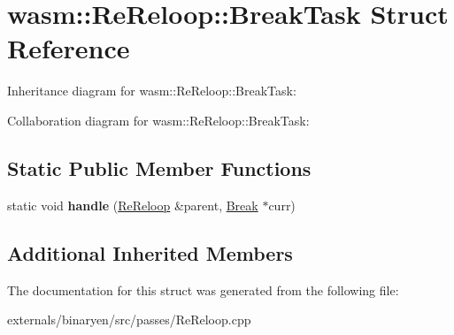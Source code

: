 \hypertarget{structwasm_1_1_re_reloop_1_1_break_task}{}\section{wasm\+:\+:Re\+Reloop\+:\+:Break\+Task Struct Reference}
\label{structwasm_1_1_re_reloop_1_1_break_task}


Inheritance diagram for wasm\+:\+:Re\+Reloop\+:\+:Break\+Task\+:


Collaboration diagram for wasm\+:\+:Re\+Reloop\+:\+:Break\+Task\+:
\subsection*{Static Public Member Functions}
\begin{DoxyCompactItemize}
\item 
\mbox{\label{structwasm_1_1_re_reloop_1_1_break_task_afcd3f832815ff62abd09ccb741e32c18}} 
static void {\bfseries handle} (\mbox{\hyperlink{structwasm_1_1_re_reloop}{Re\+Reloop}} \&parent, \mbox{\hyperlink{classwasm_1_1_break}{Break}} $\ast$curr)
\end{DoxyCompactItemize}
\subsection*{Additional Inherited Members}


The documentation for this struct was generated from the following file\+:\begin{DoxyCompactItemize}
\item 
externals/binaryen/src/passes/Re\+Reloop.\+cpp\end{DoxyCompactItemize}
